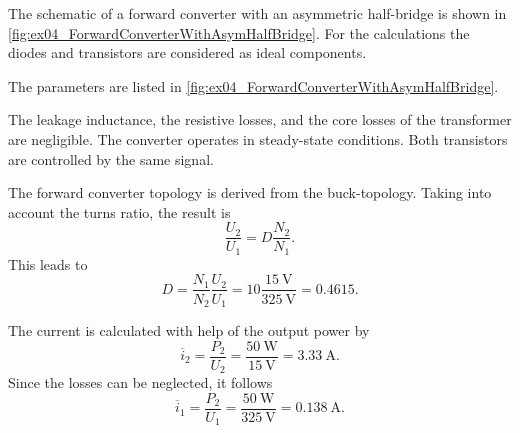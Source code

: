 

The schematic of a forward converter with an asymmetric half-bridge is shown in \autoref{fig:ex04_ForwardConverterWithAsymHalfBridge}. 
For the calculations the diodes and transistors are considered as ideal components.



The parameters are listed in \autoref{fig:ex04_ForwardConverterWithAsymHalfBridge}.


\FloatBarrier
The leakage inductance, the resistive losses, and the core losses of the transformer are negligible. 
The converter operates in steady-state conditions. Both transistors are controlled by the same signal.

\begin{solutionblock}
    The forward converter topology is derived from the buck-topology. Taking into account the turns ratio, the result is
    \begin{equation}
        \frac{U_\mathrm{2}}{U_\mathrm{1}}=D\frac{N_\mathrm{2}}{N_\mathrm{1}}.
        \label{eq:ex04voltageratioforwardconverter}
    \end{equation}
    This leads to
    \begin{equation}
        D=\frac{N_\mathrm{1}}{N_\mathrm{2}}\frac{U_\mathrm{2}}{U_\mathrm{1}}=10\frac{\SI{15}{\volt}}{\SI{325}{\volt}}=0.4615.
    \end{equation}
\end{solutionblock}

\begin{solutionblock}
    The current is calculated with help of the output power by
    \begin{equation}
        \overline{i}_\mathrm{2}=\frac{P_\mathrm{2}}{U_\mathrm{2}}=\frac{\SI{50}{\watt}}{\SI{15}{\volt}}=\SI{3.33}{\ampere}.
        \label{eq:ex04averageoutputcurrent}
    \end{equation}
    Since the losses can be neglected, it follows
    \begin{equation}
        \overline{i}_\mathrm{1}=\frac{P_\mathrm{2}}{U_\mathrm{1}}=\frac{\SI{50}{\watt}}{\SI{325}{\volt}}=\SI{0.138}{\ampere}.
    \end{equation}
\end{solutionblock}


